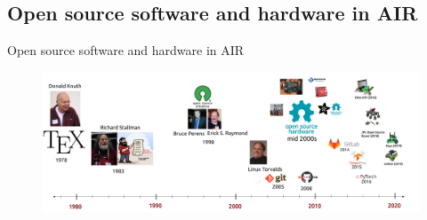 \subsection{Open source software and hardware in AIR}

{
\begin{frame}{Open source software and hardware in AIR}

      \begin{figure}
        \centering
        \includegraphics[width=1.0\textwidth]{./figures/timeline-osh/versions/drawing-v00.png}
      \end{figure}
\end{frame}
}

